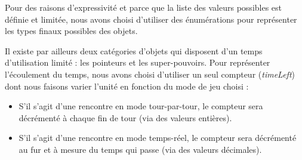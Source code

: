 \documentclass[oneside,a4paper]{book}
\begin{document}
Pour des raisons d'expressivité et parce que la liste des valeurs possibles est définie et limitée, nous avons choisi d'utiliser des énumérations pour représenter les types finaux possibles des objets.\newline

Il existe par ailleurs deux catégories d'objets qui disposent d'un temps d'utilisation limité : les pointeurs et les super-pouvoirs. Pour représenter l'écoulement du temps, nous avons choisi d'utiliser un seul compteur (\textit{timeLeft}) dont nous faisons varier l'unité en fonction du mode de jeu choisi :
\begin{itemize}
    \item S'il s'agit d'une rencontre en mode tour-par-tour, le compteur sera décrémenté à chaque fin de tour (via des valeurs entières).
    \item S'il s'agit d'une rencontre en mode temps-réel, le compteur sera décrémenté au fur et à mesure du temps qui passe (via des valeurs décimales).
\end{itemize}
\end{document}

